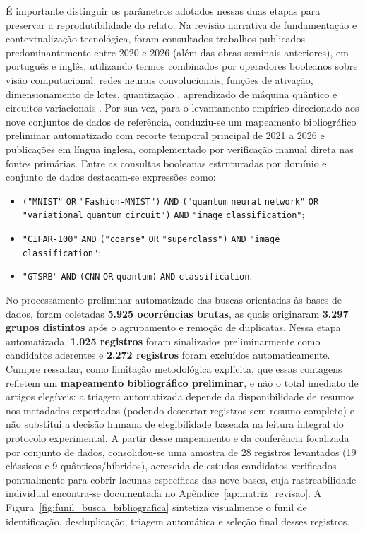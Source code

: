 \documentclass[
    12pt,
    openright,
    oneside,
    a4paper,
    english,
    brazil
]{abntex2}
\begin{document}
É importante distinguir os parâmetros adotados nessas duas etapas para preservar a reprodutibilidade do relato. Na revisão narrativa de fundamentação e contextualização tecnológica, foram consultados trabalhos publicados predominantemente entre 2020 e 2026 (além das obras seminais anteriores), em português e inglês, utilizando termos combinados por operadores booleanos sobre visão computacional, redes neurais convolucionais, funções de ativação, dimensionamento de lotes, quantização \cite{zandieh2025turboquant}, aprendizado de máquina quântico e circuitos variacionais \cite{egginger2024hyperparameter,ibmQuantumAerSimulation2026,qiskitMachineLearningTorchConnector2026}. Por sua vez, para o levantamento empírico direcionado aos nove conjuntos de dados de referência, conduziu-se um mapeamento bibliográfico preliminar automatizado com recorte temporal principal de 2021 a 2026 e publicações em língua inglesa, complementado por verificação manual direta nas fontes primárias. Entre as consultas booleanas estruturadas por domínio e conjunto de dados destacam-se expressões como:
\begin{itemize}
    \item \texttt{("MNIST"} \texttt{OR} \texttt{"Fashion-MNIST")} \texttt{AND} \texttt{("quantum} \texttt{neural} \texttt{network"} \texttt{OR} \texttt{"variational} \texttt{quantum} \texttt{circuit")} \texttt{AND} \texttt{"image} \texttt{classification"};
    \item \texttt{"CIFAR-100"} \texttt{AND} \texttt{("coarse"} \texttt{OR} \texttt{"superclass")} \texttt{AND} \texttt{"image} \texttt{classification"};
    \item \texttt{"GTSRB"} \texttt{AND} \texttt{(CNN} \texttt{OR} \texttt{quantum)} \texttt{AND} \texttt{classification}.
\end{itemize}

No processamento preliminar automatizado das buscas orientadas às bases de dados, foram coletadas \textbf{5.925 ocorrências brutas}, as quais originaram \textbf{3.297 grupos distintos} após o agrupamento e remoção de duplicatas. Nessa etapa automatizada, \textbf{1.025 registros} foram sinalizados preliminarmente como candidatos aderentes e \textbf{2.272 registros} foram excluídos automaticamente. Cumpre ressaltar, como limitação metodológica explícita, que essas contagens refletem um \textbf{mapeamento bibliográfico preliminar}, e não o total imediato de artigos elegíveis: a triagem automatizada depende da disponibilidade de resumos nos metadados exportados (podendo descartar registros sem resumo completo) e não substitui a decisão humana de elegibilidade baseada na leitura integral do protocolo experimental. A partir desse mapeamento e da conferência focalizada por conjunto de dados, consolidou-se uma amostra de 28 registros levantados (19 clássicos e 9 quânticos/híbridos), acrescida de estudos candidatos verificados pontualmente para cobrir lacunas específicas das nove bases, cuja rastreabilidade individual encontra-se documentada no Apêndice~\ref{ap:matriz_revisao}. A Figura~\ref{fig:funil_busca_bibliografica} sintetiza visualmente o funil de identificação, desduplicação, triagem automática e seleção final desses registros.
\end{document}
